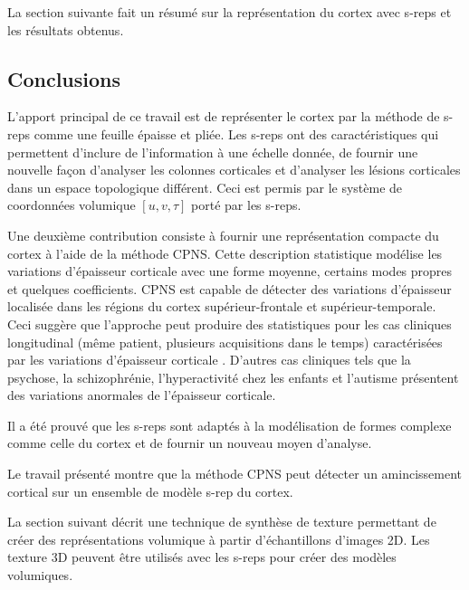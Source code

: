 La section suivante fait un résumé sur la représentation du cortex avec s-reps et les résultats obtenus.

\subsection{Conclusions}

L'apport principal de ce travail est de représenter le cortex par la méthode de s-reps comme une feuille 
épaisse et pliée.
Les s-reps ont des caractéristiques qui permettent d'inclure de l'information à une échelle donnée, 
de fournir une nouvelle façon d'analyser les colonnes corticales et
d'analyser les lésions corticales dans un espace topologique différent.
Ceci est permis par le système de coordonnées volumique $[u, v, \tau] $ porté par les s-reps.

Une deuxième contribution consiste à fournir une représentation compacte du cortex à l'aide de la méthode CPNS.
Cette description statistique modélise les variations d'épaisseur corticale avec une forme moyenne, certains modes propres et quelques coefficients.
CPNS est capable de détecter des variations d'épaisseur localisée 
dans les régions du cortex supérieur-frontale et supérieur-temporale.
Ceci suggère que l'approche peut produire des statistiques pour les cas cliniques 
longitudinal (même patient, plusieurs acquisitions dans le temps)
caractérisées par les variations d'épaisseur corticale \cite{doi:10.1080/13803390802635174}.
D'autres cas cliniques tels que la psychose, la schizophrénie, 
l'hyperactivité chez les enfants et l'autisme présentent des variations anormales de l'épaisseur corticale.

Il a été prouvé que les s-reps sont adaptés à la modélisation de formes complexe comme celle du cortex et de fournir 
un nouveau moyen d'analyse.


Le travail présenté montre que la méthode CPNS peut détecter un amincissement cortical sur un ensemble de modèle s-rep du cortex.

La section suivant décrit une technique de synthèse de texture permettant de créer des représentations volumique 
à partir d'échantillons d'images 2D. Les texture 3D peuvent être utilisés avec les s-reps pour créer des modèles volumiques.

